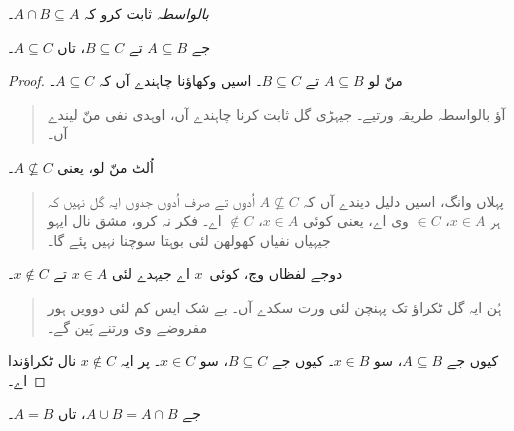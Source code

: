 \documentclass[../../../include/open-logic-section]{subfiles}
\begin{document}
\begin{prob}
\emph{بالواسطہ} ثابت کرو کہ $A \cap B \subseteq A$۔
\end{prob}

\begin{prop}
جے $A \subseteq B$ تے $B \subseteq C$، تاں $A \subseteq C$۔
\end{prop}

\begin{proof}
  منّ لو $A \subseteq B$ تے $B \subseteq C$۔ اسیں وکھاؤنا چاہندے آں کہ $A
  \subseteq C$۔
  \begin{quote}
    آؤ بالواسطہ طریقہ ورتیے۔ جیہڑی گل ثابت کرنا چاہندے آں، اوہدی نفی منّ لیندے آں۔
  \end{quote}
  اُلٹ منّ لو، یعنی $A \nsubseteq C$۔
  \begin{quote}
    پہلاں وانگ، اسیں دلیل دیندے آں کہ $A \nsubseteq C$ اُدوں تے صرف اُدوں جدوں ایہ گل نہیں کہ ہر $x \in A$، $\in C$ وی اے، یعنی کوئی $x \in A$، $\notin C$ اے۔ فکر نہ کرو، مشق نال ایہو جیہیاں نفیاں کھولھن لئی بوہتا سوچنا نہیں پئے گا۔
  \end{quote}
  دوجے لفظاں وچ، کوئی~$x$ اے جیہدے لئی $x \in A$ تے $x \notin C$۔
  \begin{quote}
    ہُن ایہ گل ٹکراؤ تک پہنچن لئی ورت سکدے آں۔ بے شک ایس کم لئی دوویں ہور مفروضے وی ورتنے پَین گے۔
  \end{quote}
  کیوں جے $A \subseteq B$، سو $x \in B$۔ کیوں جے $B \subseteq C$، سو $x \in
  C$۔ پر ایہ $x \notin C$ نال ٹکراؤندا اے۔
\end{proof}

\begin{prop}
جے $A \cup B = A \cap B$، تاں $A = B$۔
\end{prop}
\end{document}
